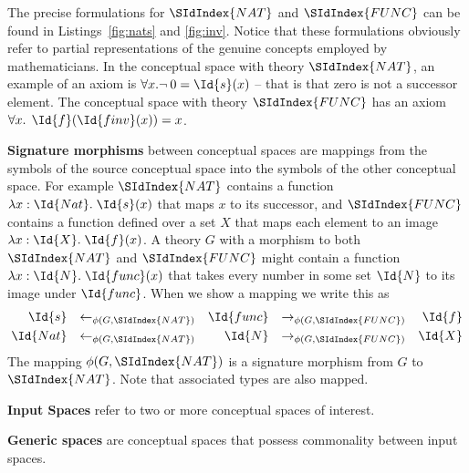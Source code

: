 The precise formulations for $\SIdIndex{NAT}$ and $ \SIdIndex{FUNC}$ can
be found in Listings~\ref{fig:nats} and \ref{fig:inv}. 
Notice that these formulations obviously refer to 
partial representations of the genuine concepts
employed by mathematicians.  
In the conceptual space with theory $\SIdIndex{NAT}$, an example of an axiom is 
$\forall x. \neg \: 0 = \Id{s}(x)$ -- that is that zero is not a successor element.
The conceptual space with theory $\SIdIndex{FUNC}$ has an axiom
$\forall x.\:\:\Id{f}(\Id{finv}(x)) = x$. 

{\bf Signature morphisms} between conceptual spaces are mappings from
the symbols of the source conceptual space into the symbols of the other
conceptual space. 
%
For example $\SIdIndex{NAT}$ contains a function $\lambda
x:\Id{Nat}.\;\Id{s}(x)$ that maps $x$ to its successor, and
$\SIdIndex{FUNC}$ contains a function defined over a set $X$ that maps
each element to an image $\lambda x:\Id{X}.\;\Id{f}(x)$.  A theory $G$
with a morphism to both $\SIdIndex{NAT}$ and $\SIdIndex{FUNC}$ might
contain a function $\lambda x:\Id{N}.\;\Id{func}(x)$ that takes every
number in some set $\Id{N}$ to its image under $\Id{func}$.
%
When we show a mapping %
we write 
this as
\begin{align}
  \Id{s}&&\leftarrow_{\phi(G,\SIdIndex{NAT})}&&\Id{func}&&\rightarrow_{\phi(G,\SIdIndex{FUNC})}&&\Id{f}\\
  \Id{Nat}&&\leftarrow_{\phi(G,\SIdIndex{NAT})}&&\Id{N}&&\rightarrow_{\phi(G,\SIdIndex{FUNC})}&&\Id{X}
\end{align}
\noindent The mapping $\phi(G,\SIdIndex{NAT})$ is a signature morphism from
$G$ to $\SIdIndex{NAT}$. Note that associated types are also mapped.

{\bf Input Spaces} refer to two or more conceptual spaces of
interest. 

{\bf Generic spaces} are conceptual spaces that possess commonality
between input spaces. 


